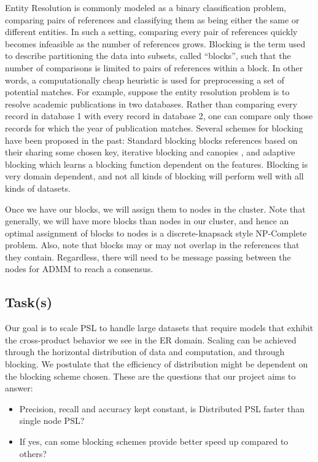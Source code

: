 \documentclass{article}
\begin{document}
Entity Resolution is commonly modeled as a binary classification problem, comparing pairs of references and classifying them as being either the same or different entities. In such a setting, comparing every pair of references quickly becomes infeasible as the number of references grows. Blocking is the term used to describe partitioning the data into subsets, called ``blocks'', such that the number of comparisons is limited to pairs of references within a block. In other words, a computationally cheap heuristic is used for preprocessing a set of potential matches. For example, suppose the entity resolution problem is to resolve academic publications in two databases. Rather than comparing every record in database 1 with every record in database 2, one can compare only those records for which the year of publication matches.  Several schemes for blocking have been proposed in the past: Standard blocking \cite{jaro1989advances} blocks references based on their sharing some chosen key, iterative blocking \cite{whang2009entity} and canopies \cite{mccallum2000efficient}, and adaptive blocking \cite{bilenko2006adaptive} which learns a blocking function dependent on the features. Blocking is very domain dependent, and not all kinds of blocking will perform well with all kinds of datasets.

Once we have our blocks, we will assign them to nodes in the cluster. Note that generally, we will have more blocks than nodes in our cluster, and hence an optimal assignment of blocks to nodes is a discrete-knapsack style NP-Complete problem. Also, note that blocks may or may not overlap in the references that they contain. Regardless, there will need to be message passing between the nodes for ADMM to reach a consensus. 

\subsection{Task(s)}

Our goal is to scale PSL to handle large datasets that require models that exhibit the cross-product behavior we see in the ER domain. Scaling can be achieved through the horizontal distribution of data and computation, and through blocking. We postulate that the efficiency of distribution might be dependent on the blocking scheme chosen. These are the questions that our project aims to answer:
\begin{itemize}
    \item Precision, recall and accuracy kept constant, is Distributed PSL faster than single node PSL?
    \item If yes, can some blocking schemes provide better speed up compared to others?
\end{itemize}
\end{document}
